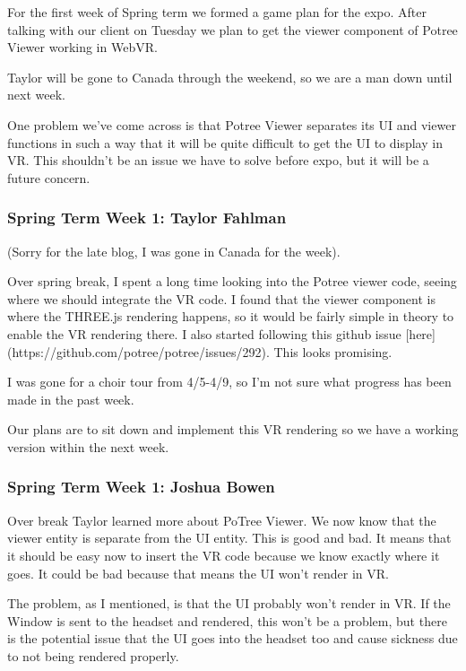\documentclass[draftclsnofoot,onecolumn]{IEEEtran}
\begin{document}
For the first week of Spring term we formed a game plan for the expo. After talking with our client on Tuesday we plan to get the viewer component of Potree Viewer working in WebVR.

Taylor will be gone to Canada through the weekend, so we are a man down until next week.

One problem we've come across is that Potree Viewer separates its UI and viewer functions in such a way that it will be quite difficult to get the UI to display in VR. This shouldn't be an issue we have to solve before expo, but it will be a future concern.

\subsubsection{Spring Term Week 1: Taylor Fahlman}

(Sorry for the late blog, I was gone in Canada for the week).

Over spring break, I spent a long time looking into the Potree viewer code, seeing where we should integrate the VR code. I found that the viewer component is where the THREE.js rendering happens, so it would be fairly simple in theory to enable the VR rendering there. I also started following this github issue [here](https://github.com/potree/potree/issues/292). This looks promising.

I was gone for a choir tour from 4/5-4/9, so I'm not sure what progress has been made in the past week.

Our plans are to sit down and implement this VR rendering so we have a working version within the next week. 

\subsubsection{Spring Term Week 1: Joshua Bowen}

Over break Taylor learned more about PoTree Viewer. We now know that the viewer entity is separate from the UI entity. This is good and bad. It means that it should be easy now to insert the VR code because we know exactly where it goes. It could be bad because that means the UI won't render in VR.

The problem, as I mentioned, is that the UI probably won't render in VR. If the Window is sent to the headset and rendered, this won't be a problem, but there is the potential issue that the UI goes into the headset too and cause sickness due to not being rendered properly.
\end{document}
